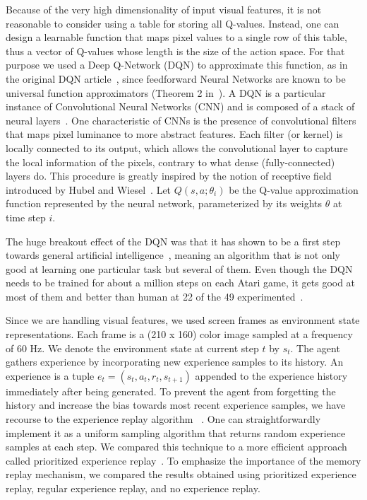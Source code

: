 \documentclass[letterpaper]{article}
\begin{document}
Because of the very high dimensionality of input visual features, it is not reasonable to consider using a table for storing all Q-values.
Instead, one can design a learnable function that maps pixel values to a single row of this table, thus a vector of Q-values whose length is the size
of the action space. For that purpose we used a Deep Q-Network (DQN) to approximate this function, as in the original DQN article~\citep{mnih2015human}, since feedforward Neural Networks
are known to be universal function approximators (Theorem 2 in~\cite{hornik1991approximation}).
A DQN is a particular instance of Convolutional Neural Networks (CNN) and is composed of a stack of neural layers~\citep{lecun1998gradient}. One characteristic of CNNs is the
presence of convolutional filters that maps pixel luminance to more abstract features. Each filter (or kernel) is locally connected to its output, which
allows the convolutional layer to capture the local information of the pixels, contrary to what dense (fully-connected) layers do. This procedure is greatly
inspired by the notion of receptive field introduced by Hubel and Wiesel~\citep{Hubel1962}.
Let $Q(s, a; \theta_i)$ be the Q-value approximation function represented by the neural network, parameterized by its weights $\theta$ at time step $i$.

The huge breakout effect of the DQN was that it has shown to be a first step towards general artificial intelligence~\citep{togelius2015ai}, meaning an
algorithm that is not only good at learning one particular task but several of them. Even though the DQN needs to be trained for about a million steps
on each Atari game, it gets good at most of them and better than human at 22 of the 49 experimented~\citep{mnih2015human}.

Since we are handling visual features, we used screen frames as environment state representations. Each frame is a (210 x 160) color image sampled at
a frequency of 60 Hz. We denote the environment state at current step $t$ by $s_t$. The agent gathers experience by incorporating new experience samples
to its history. An experience is a tuple $e_t = (s_t, a_t, r_t, s_{t+1})$ appended to the experience history immediately after being generated.
To prevent the agent from forgetting the history and increase the bias towards most recent experience samples, we have recourse to the experience
replay algorithm ~\citep{adam2012experience}. One can straightforwardly implement it as a uniform sampling algorithm that returns random experience samples at each step.
We compared this technique to a more efficient approach called prioritized experience replay~\citep{DBLP:journals/corr/SchaulQAS15}.
To emphasize the importance of the memory replay mechanism, we compared the results obtained using prioritized experience replay, regular
experience replay, and no experience replay.
\end{document}
